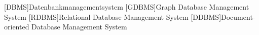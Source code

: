 
\begin{acronym}[Abkürzungsverzeichnis]
	[DBMS]{Datenbankmanagementsystem}
	[GDBMS]{Graph Database Management System}
	[RDBMS]{Relational Database Management System}
	[DDBMS]{Document-oriented Database Management System}
\end{acronym}